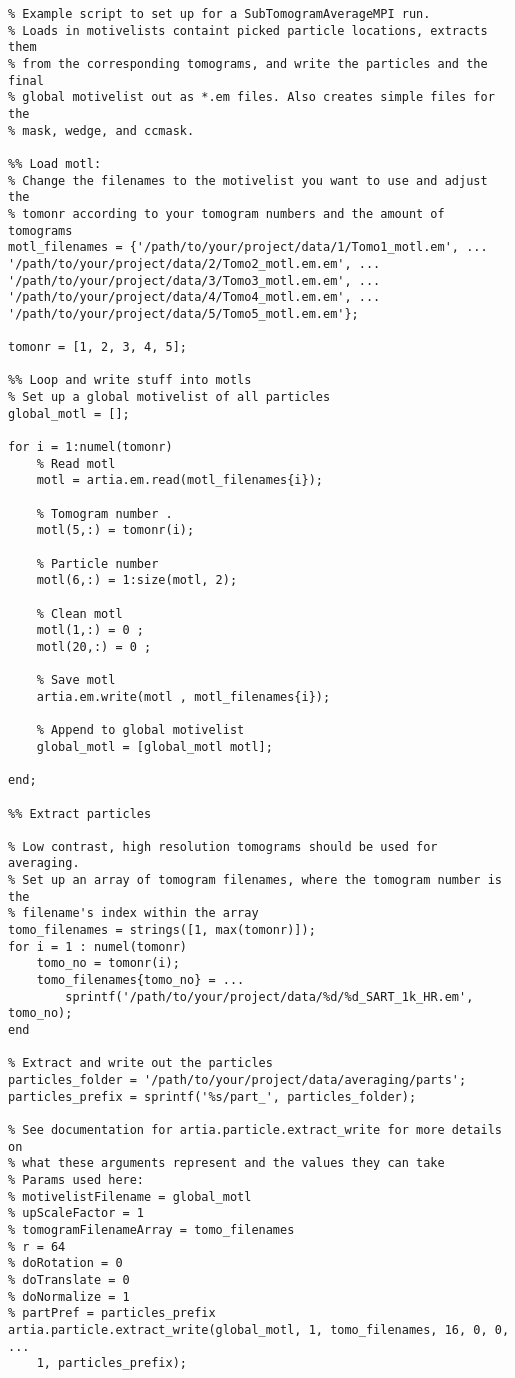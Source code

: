 \documentclass[12pt,a4paper]{scrartcl}
\begin{document}
{\begin{lstlisting}
% Example script to set up for a SubTomogramAverageMPI run.
% Loads in motivelists containt picked particle locations, extracts them
% from the corresponding tomograms, and write the particles and the final 
% global motivelist out as *.em files. Also creates simple files for the
% mask, wedge, and ccmask.

%% Load motl:
% Change the filenames to the motivelist you want to use and adjust the
% tomonr according to your tomogram numbers and the amount of tomograms
motl_filenames = {'/path/to/your/project/data/1/Tomo1_motl.em', ...
'/path/to/your/project/data/2/Tomo2_motl.em.em', ...
'/path/to/your/project/data/3/Tomo3_motl.em.em', ...
'/path/to/your/project/data/4/Tomo4_motl.em.em', ...
'/path/to/your/project/data/5/Tomo5_motl.em.em'};

tomonr = [1, 2, 3, 4, 5];

%% Loop and write stuff into motls
% Set up a global motivelist of all particles
global_motl = [];

for i = 1:numel(tomonr)
    % Read motl
    motl = artia.em.read(motl_filenames{i});
    
    % Tomogram number .
    motl(5,:) = tomonr(i);

    % Particle number
    motl(6,:) = 1:size(motl, 2);

    % Clean motl
    motl(1,:) = 0 ;
    motl(20,:) = 0 ;
    
    % Save motl
    artia.em.write(motl , motl_filenames{i});

    % Append to global motivelist 
    global_motl = [global_motl motl];

end;

%% Extract particles

% Low contrast, high resolution tomograms should be used for averaging.
% Set up an array of tomogram filenames, where the tomogram number is the 
% filename's index within the array
tomo_filenames = strings([1, max(tomonr)]);
for i = 1 : numel(tomonr)
    tomo_no = tomonr(i);
    tomo_filenames{tomo_no} = ...
        sprintf('/path/to/your/project/data/%d/%d_SART_1k_HR.em', tomo_no);
end

% Extract and write out the particles
particles_folder = '/path/to/your/project/data/averaging/parts';
particles_prefix = sprintf('%s/part_', particles_folder);

% See documentation for artia.particle.extract_write for more details on 
% what these arguments represent and the values they can take
% Params used here:
% motivelistFilename = global_motl
% upScaleFactor = 1
% tomogramFilenameArray = tomo_filenames
% r = 64
% doRotation = 0
% doTranslate = 0
% doNormalize = 1
% partPref = particles_prefix
artia.particle.extract_write(global_motl, 1, tomo_filenames, 16, 0, 0, ...
    1, particles_prefix);


\end{lstlisting}}
\end{document}
